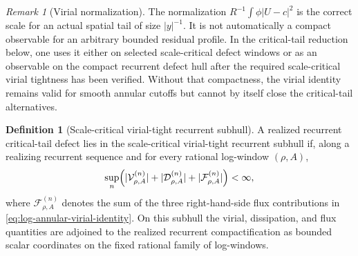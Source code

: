 \documentclass[11pt]{amsart}
\numberwithin{equation}{section}
\theoremstyle{plain}
\theoremstyle{definition}
\newtheorem{definition}[definition]{Definition}
\theoremstyle{remark}
\newtheorem{remark}[remark]{Remark}
\begin{document}
\begin{remark}[Virial normalization]
\label{rem:virial-normalization-warning}
The normalization \(R^{-1}\int\phi |U-c|^2\) is the correct scale for an actual
spatial tail of size \(|y|^{-1}\).  It is not automatically a compact observable
for an arbitrary bounded residual profile.  In the critical-tail reduction
below, one uses it either on selected scale-critical defect windows or as an
observable on the compact recurrent defect hull after the required
scale-critical virial tightness has been verified.  Without that compactness,
the virial identity remains valid for smooth annular cutoffs but cannot by
itself close the critical-tail alternatives.
\end{remark}

\begin{definition}[Scale-critical virial-tight recurrent subhull]
\label{def:scale-critical-virial-tight-subhull}
A realized recurrent critical-tail defect lies in the scale-critical virial-tight
recurrent subhull if, along a realizing recurrent sequence and for every
rational log-window \((\rho,A)\),
\[
   \sup_n
   \Bigl(
      |\mathcal V_{\rho,A}^{(n)}|
      +|\mathcal D_{\rho,A}^{(n)}|
      +|\mathcal F_{\rho,A}^{(n)}|
   \Bigr)<\infty ,
\]
where \(\mathcal F_{\rho,A}^{(n)}\) denotes the sum of the three right-hand-side
flux contributions in \eqref{eq:log-annular-virial-identity}.  On this subhull
the virial, dissipation, and flux quantities are adjoined to the realized
recurrent compactification as bounded scalar coordinates on the fixed rational
family of log-windows.
\end{definition}
\end{document}
